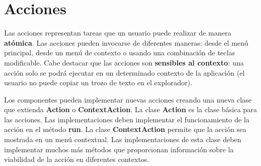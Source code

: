 \section{Acciones}\label{sec:acciones}

Las acciones representan tareas que un usuario puede realizar de manera
\textbf{atómica}.
Las acciones pueden invocarse de diferentes maneras:
desde el menú principal, desde un menú de contexto
o usando una combinación de teclas modificable.
Cabe destacar que las acciones son \textbf{sensibles al contexto}:
una acción solo se podrá ejecutar en un determinado contexto
de la aplicación (el usuario no puede copiar un trozo de texto
en el explorador).

\noindent Los componentes pueden implementar nuevas acciones
creando una nueva clase que extienda \textbf{Action} o
\textbf{ContextAction}.
La clase \textbf{Action} es la clase básica para las acciones.
Las implementaciones deben implementar el funcionamiento
de la acción en el método \textbf{run}.
La clase \textbf{ContextAction} permite que la acción sea
mostrada en un menú contextual.
Las implementaciones de esta clase deben implementar
muchos más métodos que proporcionan información
sobre la viabilidad de la acción en diferentes contextos.